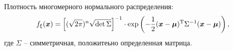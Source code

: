 Плотность многомерного нормального распределения:
\begin{equation*}
    f_\xi (\mbox{\boldmath $x$}) = \left[
        (\sqrt{2\pi})^n \sqrt{\det \Sigma}
    \right]^{-1} \cdot \exp\left(
        - \frac{1}{2} (\mbox{\boldmath $x$}-\mbox{\boldmath $\mu$})^{\text{T}} \Sigma^{-1} (\mbox{\boldmath $x$} - \mbox{\boldmath $\mu$})
    \right),
\end{equation*}
где $\Sigma$ -- симметричная, положитеьно определенная матрица. 







